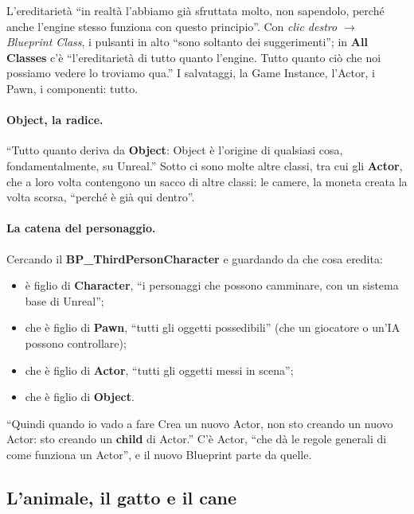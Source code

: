 L'ereditarietà ``in realtà l'abbiamo già sfruttata molto, non sapendolo, perché
anche l'engine stesso funziona con questo principio''. Con \emph{clic destro
$\rightarrow$ Blueprint Class}, i pulsanti in alto ``sono soltanto dei
suggerimenti''; in \textbf{All Classes} c'è ``l'ereditarietà di tutto quanto
l'engine. Tutto quanto ciò che noi possiamo vedere lo troviamo qua.'' I
salvataggi, la Game Instance, l'Actor, i Pawn, i componenti: tutto.

\paragraph{Object, la radice.} ``Tutto quanto deriva da \textbf{Object}: Object è
l'origine di qualsiasi cosa, fondamentalmente, su Unreal.'' Sotto ci sono molte
altre classi, tra cui gli \textbf{Actor}, che a loro volta contengono un sacco di
altre classi: le camere, la moneta creata la volta scorsa, ``perché è già qui
dentro''.

\paragraph{La catena del personaggio.} Cercando il \textbf{BP\_ThirdPersonCharacter}
e guardando da che cosa eredita:
\begin{itemize}
  \item è figlio di \textbf{Character}, ``i personaggi che possono camminare,
        con un sistema base di Unreal'';
  \item che è figlio di \textbf{Pawn}, ``tutti gli oggetti possedibili'' (che un
        giocatore o un'IA possono controllare);
  \item che è figlio di \textbf{Actor}, ``tutti gli oggetti messi in scena'';
  \item che è figlio di \textbf{Object}.
\end{itemize}
``Quindi quando io vado a fare Crea un nuovo Actor, non sto creando un nuovo
Actor: sto creando un \textbf{child} di Actor.'' C'è Actor, ``che dà le regole
generali di come funziona un Actor'', e il nuovo Blueprint parte da quelle.

\subsection{L'animale, il gatto e il cane}

